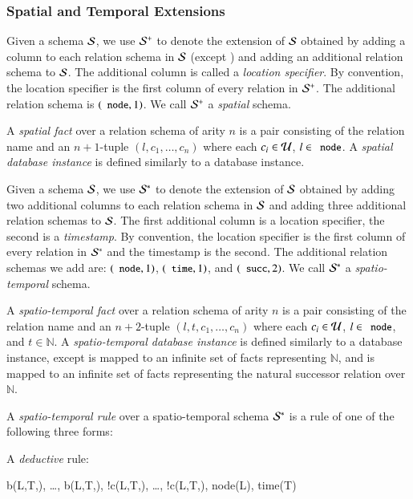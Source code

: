 \subsubsection{Spatial and Temporal Extensions}

Given a schema $\schema$, we use $\sschema$ to denote the extension of $\schema$
obtained by adding a column to each relation schema in $\schema$ (except
\dedalus{<}) and adding an additional relation schema to $\schema$.  The
additional column is called a {\em location specifier}.  By convention, the
location specifier is the first column of every relation in $\sschema$.  The
additional relation schema is $(\dedalus{node},1)$.  We call $\sschema$ a {\em
  spatial} schema.

A {\em spatial fact} over a relation schema of arity $n$ is a pair consisting of the relation name and an $n+1$-tuple $(l,c_1,\ldots,c_n)$ where each $c_i \in \univ$, $l \in \dedalus{node}$.  A {\em spatial database instance} is defined similarly to a database instance.

Given a schema $\schema$, we use $\stschema$ to denote the extension of
$\schema$ obtained by adding two additional columns to each relation schema in $\schema$ and adding three additional relation schemas to $\schema$. 
The first additional column is a location specifier, the second is a {\em timestamp}.  By convention, the location specifier is the first column of every relation in $\stschema$ and the timestamp is the second.  
The additional relation schemas we add are: $(\dedalus{node},1)$,
$(\dedalus{time},1)$, and $(\dedalus{succ},2)$.
We call $\stschema$ a {\em spatio-temporal} schema.

A {\em spatio-temporal fact} over a relation schema of arity $n$ is a pair consisting of the relation name and an $n+2$-tuple $(l,t,c_1,\ldots,c_n)$ where each $c_i \in \univ$, $l \in \dedalus{node}$, and $t \in \mathbb{N}$.  A {\em spatio-temporal database instance} is defined similarly to a database instance, except  is mapped to an infinite set of  facts representing $\mathbb{N}$, and  is mapped to an infinite set of  facts representing the natural successor relation over $\mathbb{N}$.

A {\em spatio-temporal rule} over a spatio-temporal schema $\stschema$ is a rule of one of the following three forms:

A {\em deductive} rule:

\begin{Drules}
        {b(L,T,), \ldots, b(L,T,), !c(L,T,), \ldots, !c(L,T,), node(L), time(T)}
\end{Drules}

